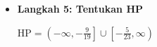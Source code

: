 \documentclass[10pt,a4paper]{article}
\begin{document}
\begin{enumerate}
\begin{itemize}
\begin{itemize}
\begin{center}
\begin{tikzpicture}[scale=0.8]
\end{tikzpicture}
\end{center}

\item \textbf{Langkah 5: Tentukan HP}

$\text{HP} = \left(-\infty, -\frac{9}{19}\right] \cup \left[-\frac{5}{23}, \infty\right)$

\end{itemize}
\end{itemize}

\end{enumerate}
\end{document}

